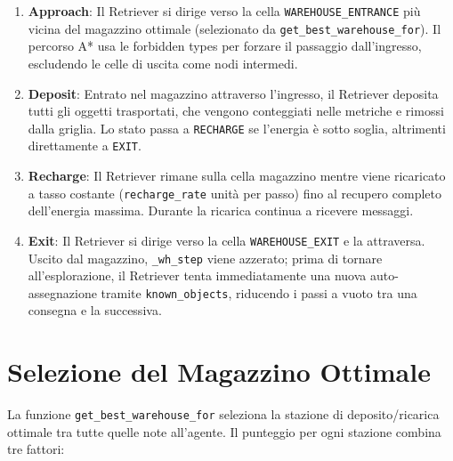 \begin{enumerate}
    \item \textbf{Approach}: Il Retriever si dirige verso la cella \texttt{WAREHOUSE\_ENTRANCE}
          pi\`u vicina del magazzino ottimale (selezionato da \texttt{get\_best\_warehouse\_for}).
          Il percorso A* usa le forbidden types per forzare il passaggio dall'ingresso,
          escludendo le celle di uscita come nodi intermedi.
    \item \textbf{Deposit}: Entrato nel magazzino attraverso l'ingresso, il Retriever
          deposita tutti gli oggetti trasportati, che vengono conteggiati nelle metriche
          e rimossi dalla griglia. Lo stato passa a \texttt{RECHARGE} se l'energia \`e
          sotto soglia, altrimenti direttamente a \texttt{EXIT}.
    \item \textbf{Recharge}: Il Retriever rimane sulla cella magazzino mentre viene ricaricato
          a tasso costante (\texttt{recharge\_rate} unit\`a per passo) fino al recupero
          completo dell'energia massima. Durante la ricarica continua a ricevere messaggi.
    \item \textbf{Exit}: Il Retriever si dirige verso la cella \texttt{WAREHOUSE\_EXIT} e
          la attraversa. Uscito dal magazzino, \texttt{\_wh\_step} viene azzerato; prima
          di tornare all'esplorazione, il Retriever tenta immediatamente una nuova
          auto-assegnazione tramite \texttt{known\_objects}, riducendo i passi a vuoto
          tra una consegna e la successiva.
\end{enumerate}

\section{Selezione del Magazzino Ottimale}

La funzione \texttt{get\_best\_warehouse\_for} seleziona la stazione di deposito/ricarica
ottimale tra tutte quelle note all'agente. Il punteggio per ogni stazione combina tre fattori:

